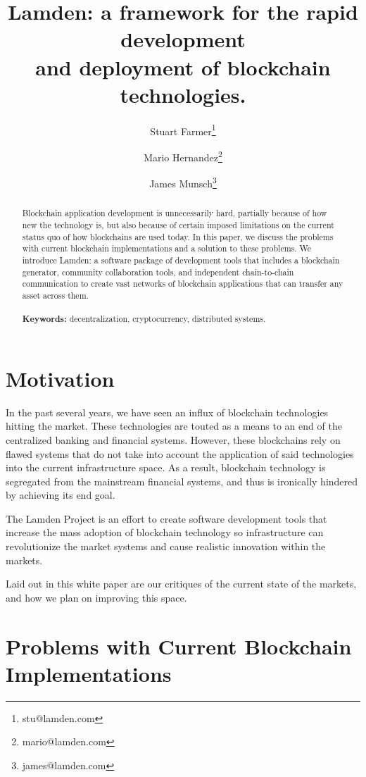 \documentclass{%
	article}
\title{Lamden: a framework for the rapid development\\and deployment of blockchain technologies.}
\author{Stuart Farmer\thanks{stu@lamden.com}}
\author{Mario Hernandez\thanks{mario@lamden.com}}
\author{James Munsch\thanks{james@lamden.com}}
\affil{The Lamden Project, White Paper version 0.2.0}
\begin{document}
\sloppy

\begin{titlingpage}
    \maketitle
    \begin{abstract}
	Blockchain application development is unnecessarily hard, partially because of how new the technology is, but also because of certain imposed limitations on the current status quo of how blockchains are used today. In this paper, we discuss the problems with current blockchain implementations and a solution to these problems. We introduce Lamden: a software package of development tools that includes a blockchain generator, community collaboration tools, and independent chain-to-chain communication to create vast networks of blockchain applications that can transfer any asset across them.\\\\
	{\bf Keywords:} decentralization, cryptocurrency, distributed systems.
    \end{abstract}
\end{titlingpage}

\section{Motivation}

In the past several years, we have seen an influx of blockchain technologies hitting the market. These technologies are touted as a means to an end of the centralized banking and financial systems. However, these blockchains rely on flawed systems that do not take into account the application of said technologies into the current infrastructure space. As a result, blockchain technology is segregated from the mainstream financial systems, and thus is ironically hindered by achieving its end goal.

The Lamden Project is an effort to create software development tools that increase the mass adoption of blockchain technology so infrastructure can revolutionize the market systems and cause realistic innovation within the markets.

Laid out in this white paper are our critiques of the current state of the markets, and how we plan on improving this space.

\section{Problems with Current Blockchain\\ Implementations}
\end{document}
